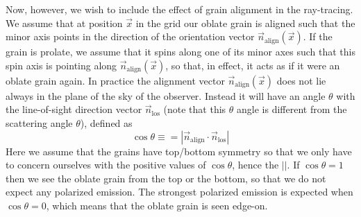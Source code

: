 \documentclass{report}
\begin{document}
Now, however, we wish to include the effect of grain alignment in the
ray-tracing. We assume that at position $\vec x$ in the grid our oblate
grain is aligned such that the minor axis points in the direction of the
orientation vector $\vec n_{\mathrm{align}}(\vec x)$. If the grain is
prolate, we assume that it spins along one of its minor axes such that this
spin axis is pointing along $\vec n_{\mathrm{align}}(\vec x)$, so that, in
effect, it acts as if it were an oblate grain again. In practice the
alignment vector $\vec n_{\mathrm{align}}(\vec x)$ does not lie always in
the plane of the sky of the observer. Instead it will have an angle $\theta$
with the line-of-sight direction vector $\vec n_{\mathrm{los}}$ (note that
this $\theta$ angle is different from the scattering angle $\theta$), 
defined as
\begin{equation}
\cos\theta \equiv = \left|\vec n_{\mathrm{align}}\cdot 
\vec n_{\mathrm{los}}\right|
\end{equation}
Here we assume that the grains have top/bottom symmetry so that we only
have to concern ourselves with the positive values of $\cos\theta$, hence
the $||$. If $\cos\theta=1$ then we see the oblate grain from the top or
the bottom, so that we do not expect any polarized emission. The strongest
polarized emission is expected when $\cos\theta=0$, which means that the 
oblate grain is seen edge-on. 
\end{document}
